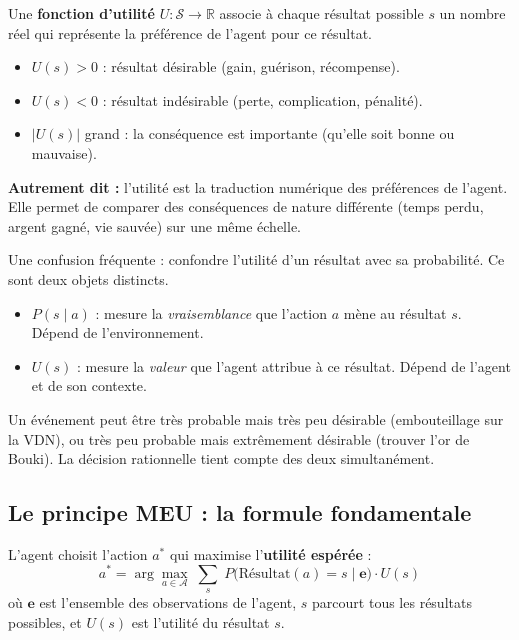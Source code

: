 \documentclass[11pt,a4paper]{article}
\begin{document}
\begin{definitionbox}
Une \textbf{fonction d'utilité} $U : \mathcal{S} \to \mathbb{R}$ associe à chaque résultat possible $s$ un nombre réel qui représente la préférence de l'agent pour ce résultat.

\begin{itemize}[nosep]
    \item $U(s) > 0$ : résultat désirable (gain, guérison, récompense).
    \item $U(s) < 0$ : résultat indésirable (perte, complication, pénalité).
    \item $|U(s)|$ grand : la conséquence est importante (qu'elle soit bonne ou mauvaise).
\end{itemize}

\textbf{Autrement dit :} l'utilité est la traduction numérique des préférences de l'agent. Elle permet de comparer des conséquences de nature différente (temps perdu, argent gagné, vie sauvée) sur une même échelle.
\end{definitionbox}

\begin{attentionbox}
Une confusion fréquente : confondre l'utilité d'un résultat avec sa probabilité. Ce sont deux objets distincts.
\begin{itemize}[nosep]
    \item $P(s \mid a)$ : mesure la \textit{vraisemblance} que l'action $a$ mène au résultat $s$. Dépend de l'environnement.
    \item $U(s)$ : mesure la \textit{valeur} que l'agent attribue à ce résultat. Dépend de l'agent et de son contexte.
\end{itemize}
Un événement peut être très probable mais très peu désirable (embouteillage sur la VDN), ou très peu probable mais extrêmement désirable (trouver l'or de Bouki). La décision rationnelle tient compte des deux simultanément.
\end{attentionbox}

\subsection{Le principe MEU : la formule fondamentale}

\begin{theorembox}
L'agent choisit l'action $a^*$ qui maximise l'\textbf{utilité espérée} :
$$\boxed{a^* = \arg\max_{a \in \mathcal{A}} \; \sum_{s} \; P\!\bigl(\mathrm{Résultat}(a) = s \mid \mathbf{e}\bigr) \cdot U(s)}$$
où $\mathbf{e}$ est l'ensemble des observations de l'agent, $s$ parcourt tous les résultats possibles, et $U(s)$ est l'utilité du résultat $s$.
\end{theorembox}
\end{document}
